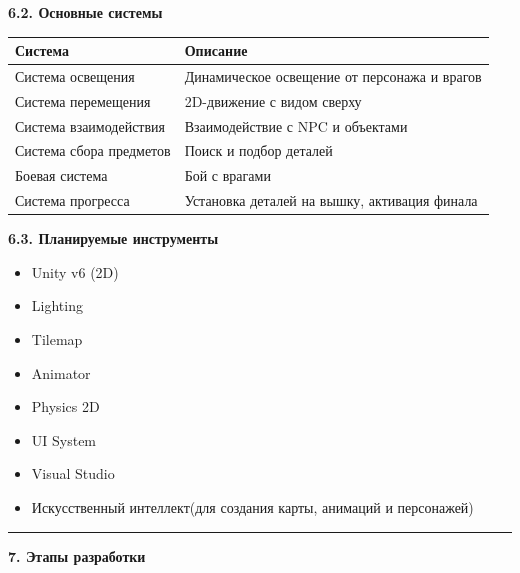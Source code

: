\documentclass[
]{article}
\begin{document}
\textbf{6.2. Основные системы}

\begin{longtable}[]{@{}
  >{\raggedright\arraybackslash}p{}
  >{\raggedright\arraybackslash}p{}@{}}
\toprule\noalign{}
\begin{minipage}[b]{\linewidth}\raggedright
Система
\end{minipage} & \begin{minipage}[b]{\linewidth}\raggedright
Описание
\end{minipage} \\
\midrule\noalign{}
\endhead
\bottomrule\noalign{}
\endlastfoot
Система освещения & Динамическое освещение от персонажа и врагов \\
Система перемещения & 2D-движение с видом сверху \\
Система взаимодействия & Взаимодействие с NPC и объектами \\
Система сбора предметов & Поиск и подбор деталей \\
Боевая система & Бой с врагами \\
Система прогресса & Установка деталей на вышку, активация финала \\
\end{longtable}

\textbf{6.3. Планируемые инструменты}

\begin{itemize}
\item
  Unity v6 (2D)
\item
  Lighting
\item
  Tilemap
\item
  Animator
\item
  Physics 2D
\item
  UI System
\item
  Visual Studio
\item
  Искусственный интеллект(для создания карты, анимаций и персонажей)
\end{itemize}

\begin{center}\rule{0.5\linewidth}{0.5pt}\end{center}

\textbf{7. Этапы разработки}
\end{document}
